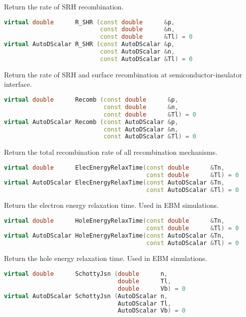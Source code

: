 \documentclass[oneside,12pt]{cgd_book}
\begin{document}
Return the rate of SRH recombination.
\par
\begin{lstlisting}[language={C++}]
virtual double      R_SHR (const double      &p,
                           const double      &n,
                           const double      &Tl) = 0
virtual AutoDScalar R_SHR (const AutoDScalar &p,
                           const AutoDScalar &n,
                           const AutoDScalar &Tl) = 0
\end{lstlisting}
Return the rate of SRH and surface recombination at semiconductor-insulator interface.
\par
\begin{lstlisting}[language={C++}]
virtual double      Recomb (const double      &p,
                            const double      &n,
                            const double      &Tl) = 0
virtual AutoDScalar Recomb (const AutoDScalar &p,
                            const AutoDScalar &n,
                            const AutoDScalar &Tl) = 0
\end{lstlisting}
Return the total recombination rate of all recombination mechanisms.
\par
\begin{lstlisting}[language={C++}]
virtual double      ElecEnergyRelaxTime(const double      &Tn,
                                        const double      &Tl) = 0
virtual AutoDScalar ElecEnergyRelaxTime(const AutoDScalar &Tn,
                                        const AutoDScalar &Tl) = 0
\end{lstlisting}
Return the electron energy relaxation time. Used in EBM simulations.
\par
\begin{lstlisting}[language={C++}]
virtual double      HoleEnergyRelaxTime(const double      &Tn,
                                        const double      &Tl) = 0
virtual AutoDScalar HoleEnergyRelaxTime(const AutoDScalar &Tn,
                                        const AutoDScalar &Tl) = 0
\end{lstlisting}
Return the hole energy relaxation time. Used in EBM simulations.
\par
\begin{lstlisting}[language={C++}]
virtual double      SchottyJsn (double      n,
                                double      Tl,
                                double      Vb) = 0
virtual AutoDScalar SchottyJsn (AutoDScalar n,
                                AutoDScalar Tl,
                                AutoDScalar Vb) = 0
\end{lstlisting}
\end{document}
